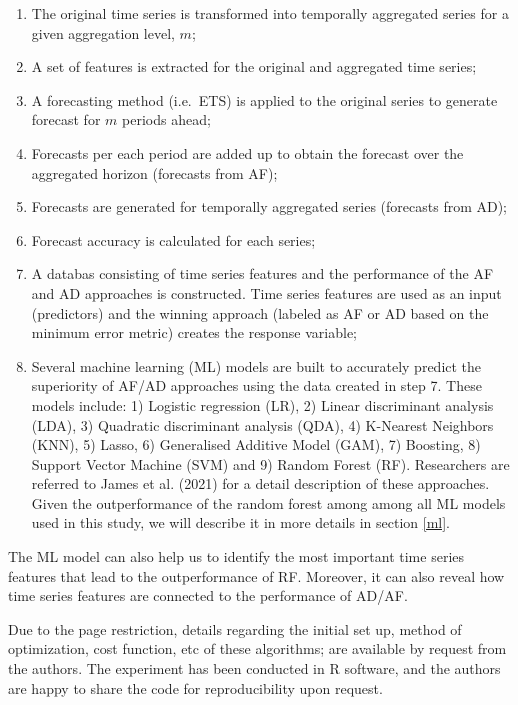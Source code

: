 \documentclass[]{elsarticle} %
\begin{document}
\begin{enumerate}
\def\labelenumi{\arabic{enumi}.}
\item
  The original time series is transformed into temporally aggregated
  series for a given aggregation level, \(m\);
\item
  A set of features is extracted for the original and aggregated time
  series;
\item
  A forecasting method (i.e.~ETS) is applied to the original series to
  generate forecast for \(m\) periods ahead;
\item
  Forecasts per each period are added up to obtain the forecast over the
  aggregated horizon (forecasts from AF);
\item
  Forecasts are generated for temporally aggregated series (forecasts
  from AD);
\item
  Forecast accuracy is calculated for each series;
\item
  A databas consisting of time series features and the performance of
  the AF and AD approaches is constructed. Time series features are used
  as an input (predictors) and the winning approach (labeled as AF or AD
  based on the minimum error metric) creates the response variable;
\item
  Several machine learning (ML) models are built to accurately predict
  the superiority of AF/AD approaches using the data created in step 7.
  These models include: 1) Logistic regression (LR), 2) Linear
  discriminant analysis (LDA), 3) Quadratic discriminant analysis (QDA),
  4) K-Nearest Neighbors (KNN), 5) Lasso, 6) Generalised Additive Model
  (GAM), 7) Boosting, 8) Support Vector Machine (SVM) and 9) Random
  Forest (RF). Researchers are referred to James et al. (2021) for a
  detail description of these approaches. Given the outperformance of
  the random forest among among all ML models used in this study, we
  will describe it in more details in section \ref{ml}.
\end{enumerate}

The ML model can also help us to identify the most important time series
features that lead to the outperformance of RF. Moreover, it can also
reveal how time series features are connected to the performance of
AD/AF.

Due to the page restriction, details regarding the initial set up,
method of optimization, cost function, etc of these algorithms; are
available by request from the authors. The experiment has been conducted
in R software, and the authors are happy to share the code for
reproducibility upon request.
\end{document}

